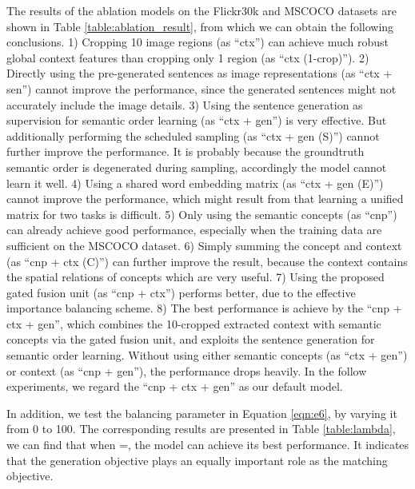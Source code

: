 \documentclass[10pt,twocolumn,letterpaper]{article}
\begin{document}
The results of the ablation models on the Flickr30k and MSCOCO datasets
are shown in Table \ref{table:ablation_result},
from which we can obtain the following conclusions.
1) Cropping 10 image regions (as ``ctx'') can achieve much robust global
context features than cropping only 1 region (as ``ctx (1-crop)'').
2) Directly using the pre-generated sentences as image representations
(as ``ctx + sen'') cannot improve the performance,
since the generated sentences might not accurately
include the image details.
3) Using the sentence generation as supervision
for semantic order learning (as ``ctx + gen'') is very effective.
But additionally performing the scheduled sampling (as ``ctx + gen (S)'') cannot
further improve the performance. It is probably because the groundtruth semantic order
is degenerated during sampling, accordingly the model cannot learn it well.
4) Using a shared word embedding matrix (as ``ctx + gen (E)'') cannot improve
the performance, which might result from that learning a unified
matrix for two tasks is difficult.
5) Only using the semantic concepts (as ``cnp'') can already achieve good performance,
especially when the training data are sufficient on the MSCOCO dataset.
6) Simply summing the concept and context (as ``cnp + ctx (C)'')
can further improve the result,
because the context contains the spatial relations of concepts which are very useful.
7) Using the proposed gated fusion unit (as ``cnp + ctx'') performs better, due to
the effective importance balancing scheme.
8) The best performance is achieve by the ``cnp + ctx + gen'',
which combines the 10-cropped extracted context
with semantic concepts via the gated fusion unit,
and exploits the sentence generation for semantic order learning.
Without using either semantic concepts (as ``ctx + gen'') or context (as ``cnp + gen''),
the performance drops heavily.
In the follow experiments, we regard the ``cnp + ctx + gen'' as our default model.

In addition, we test the balancing parameter 
in Equation \ref {eqn:e6}, by varying it from 0 to 100.
The corresponding results are presented in Table \ref{table:lambda},
we can find that when =, the model can achieve its best performance.
It indicates that the generation objective plays an equally important role as the
matching objective.
\end{document}
